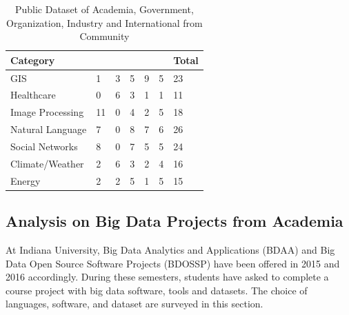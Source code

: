 \documentclass[9pt,twocolumn,twoside]{styles/osajnl}
\newcommand*\rot{\rotatebox{90}}
\begin{document}
\begin{table}[htb]
  \begin{center}
    \begin{small}
      \caption{Public Dataset of Academia, Government, Organization,
        Industry and International from Community}
      \label{tab:dataset-sector}
      \begin{tabular}{l|l|l|l|l|l|l}

    Category         & \rot{Academia} & \rot{Government} & \rot{Organization} & \rot{Industry} & \rot{International} & Total \\ \hline \hline
    GIS              & 1              & 3                & 5                  & 9              & 5                   & 23    \\ \hline
    Healthcare       & 0              & 6                & 3                  & 1              & 1                   & 11    \\ \hline
    Image Processing & 11             & 0                & 4                  & 2              & 5                   & 18    \\ \hline
    Natural Language & 7              & 0                & 8                  & 7              & 6                   & 26    \\ \hline
    Social Networks  & 8              & 0                & 7                  & 5              & 5                   & 24    \\ \hline
    Climate/Weather  & 2              & 6                & 3                  & 2              & 4                   & 16    \\ \hline
    Energy           & 2              & 2                & 5                  & 1              & 5                   & 15    \\ 

      \end{tabular}
    \end{small}
  \end{center}
\end{table}


\subsection{Analysis on Big Data Projects from Academia}

At Indiana University, Big Data Analytics and Applications (BDAA) and
Big Data Open Source Software Projects (BDOSSP) have been offered in
2015 and 2016 accordingly. During these semesters, students have asked
to complete a course project with big data software, tools and
datasets. The choice of languages, software, and dataset are
surveyed in this section.
\end{document}
